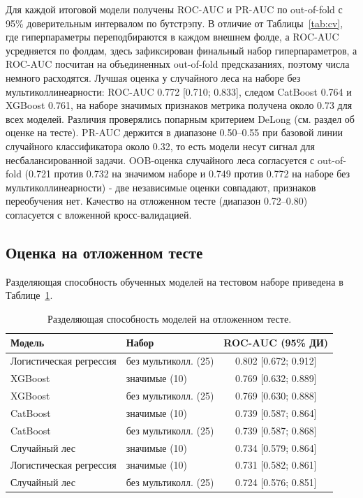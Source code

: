 \documentclass[12pt,a4paper]{article}
\begin{document}
Для каждой итоговой модели получены ROC-AUC и PR-AUC по out-of-fold с 95\% доверительным
интервалом по бутстрэпу. В отличие от Таблицы~\ref{tab:cv}, где гиперпараметры
переподбираются в каждом внешнем фолде, а ROC-AUC усредняется по фолдам, здесь зафиксирован
финальный набор гиперпараметров, а ROC-AUC посчитан на объединенных out-of-fold
предсказаниях, поэтому числа немного расходятся. Лучшая оценка у случайного леса на наборе
без мультиколлинеарности: ROC-AUC 0.772 [0.710; 0.833], следом CatBoost 0.764 и XGBoost
0.761, на наборе значимых признаков метрика получена около 0.73 для всех моделей. Различия
проверялись попарным критерием DeLong (см. раздел об оценке на тесте). PR-AUC держится в
диапазоне 0.50--0.55 при базовой линии случайного классификатора около 0.32, то есть модели
несут сигнал для несбалансированной задачи. OOB-оценка случайного леса согласуется с
out-of-fold (0.721 против 0.732 на значимом наборе и 0.749 против 0.772 на наборе без
мультиколлинеарности) - две независимые оценки совпадают, признаков переобучения нет.
Качество на отложенном тесте (диапазон 0.72--0.80) согласуется с вложенной кросс-валидацией.

\subsection{Оценка на отложенном тесте}

Разделяющая способность обученных моделей на тестовом наборе приведена в
Таблице~\ref{tab:test}.

\begin{table}[ht]
  \centering
  \caption{Разделяющая способность моделей на отложенном тесте.}
  \label{tab:test}
  \begin{tabular}{l l c}
    \toprule
    Модель & Набор & ROC-AUC (95\% ДИ) \\
    \midrule
    Логистическая регрессия & без мультиколл. (25) & 0.802 [0.672; 0.912] \\
    XGBoost & значимые (10) & 0.769 [0.632; 0.889] \\
    XGBoost & без мультиколл. (25) & 0.769 [0.630; 0.888] \\
    CatBoost & значимые (10) & 0.739 [0.587; 0.864] \\
    CatBoost & без мультиколл. (25) & 0.739 [0.587; 0.868] \\
    Случайный лес & значимые (10) & 0.734 [0.579; 0.864] \\
    Логистическая регрессия & значимые (10) & 0.731 [0.582; 0.861] \\
    Случайный лес & без мультиколл. (25) & 0.724 [0.576; 0.851] \\
    \bottomrule
  \end{tabular}
\end{table}
\end{document}
